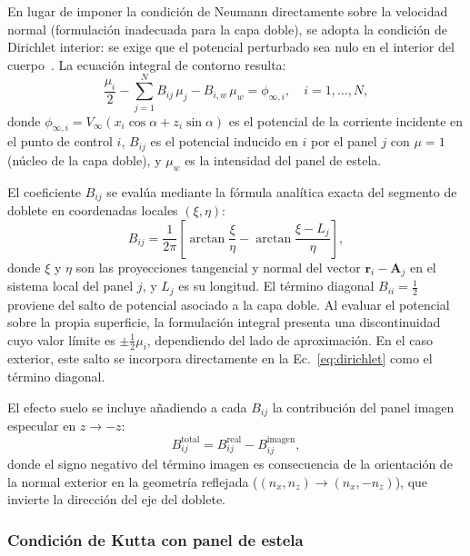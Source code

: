 \documentclass[twocolumn]{article}
\begin{document}
En lugar de imponer la condición de Neumann directamente sobre la
velocidad normal (formulación inadecuada para la capa doble), se
adopta la condición de Dirichlet interior: se exige que el potencial
perturbado sea nulo en el interior del cuerpo~\cite{katz2001}. La
ecuación integral de contorno resulta:
\begin{equation}
  \frac{\mu_i}{2} - \sum_{j=1}^{N} B_{ij}\,\mu_j
  - B_{i,w}\,\mu_w = \phi_{\infty,i},
  \quad i = 1,\ldots,N,
  \label{eq:dirichlet}
\end{equation}
donde $\phi_{\infty,i} = V_\infty(x_i\cos\alpha + z_i\sin\alpha)$
es el potencial de la corriente incidente en el punto de control $i$,
$B_{ij}$ es el potencial inducido en $i$ por el panel $j$ con
$\mu = 1$ (núcleo de la capa doble), y $\mu_w$ es la intensidad del
panel de estela.

El coeficiente $B_{ij}$ se evalúa mediante la fórmula analítica exacta
del segmento de doblete en coordenadas locales $(\xi,\eta)$:
\begin{equation}
  B_{ij} = \frac{1}{2\pi}
  \left[
    \arctan\!\frac{\xi}{{\eta}} -
    \arctan\!\frac{\xi - L_j}{\eta}
  \right],
  \label{eq:Bij}
\end{equation}
donde $\xi$ y $\eta$ son las proyecciones tangencial y normal del vector
$\mathbf{r}_i - \mathbf{A}_j$ en el sistema local del panel $j$,
y $L_j$ es su longitud. El término diagonal \( B_{ii} = \tfrac{1}{2} \) proviene del salto de potencial asociado a la capa doble. Al evaluar el potencial sobre la propia superficie, la formulación integral presenta una discontinuidad cuyo valor límite es \( \pm \tfrac{1}{2}\mu_i \), dependiendo del lado de aproximación. En el caso exterior, este salto se incorpora directamente en la Ec.~\eqref{eq:dirichlet} como el término diagonal.

El efecto suelo se incluye añadiendo a cada $B_{ij}$ la contribución
del panel imagen especular en $z \to -z$:
\begin{equation}
  B_{ij}^\text{total} = B_{ij}^\text{real} - B_{ij}^\text{imagen},
  \label{eq:Bij_total}
\end{equation}
donde el signo negativo del término imagen es consecuencia de la
orientación de la normal exterior en la geometría reflejada
($(n_x, n_z) \to (n_x, -n_z)$), que invierte la dirección del
eje del doblete.

\subsubsection{Condición de Kutta con panel de estela}
\end{document}
